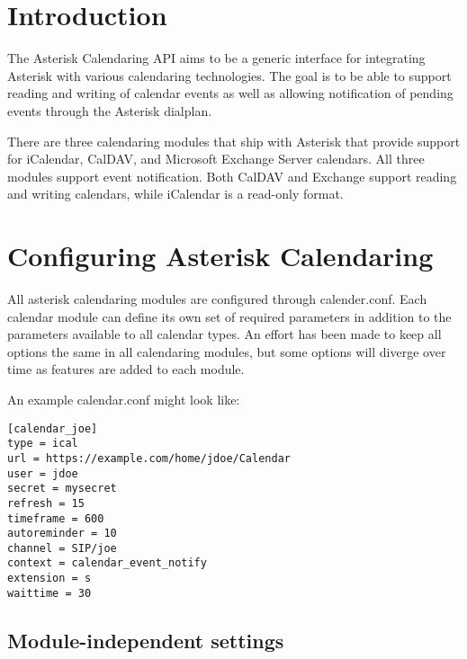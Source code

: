 \section{Introduction}

The Asterisk Calendaring API aims to be a generic interface for integrating
Asterisk with various calendaring technologies. The goal is to be able to
support reading and writing of calendar events as well as allowing notification
of pending events through the Asterisk dialplan.

There are three calendaring modules that ship with Asterisk that provide support
for iCalendar, CalDAV, and Microsoft Exchange Server calendars. All three
modules support event notification. Both CalDAV and Exchange support reading
and writing calendars, while iCalendar is a read-only format.

\section{Configuring Asterisk Calendaring}

All asterisk calendaring modules are configured through calender.conf. Each
calendar module can define its own set of required parameters in addition to the
parameters available to all calendar types. An effort has been made to keep all
options the same in all calendaring modules, but some options will diverge over
time as features are added to each module.

An example calendar.conf might look like:
\begin{astlisting}
\begin{verbatim}
[calendar_joe]
type = ical
url = https://example.com/home/jdoe/Calendar
user = jdoe
secret = mysecret
refresh = 15
timeframe = 600
autoreminder = 10
channel = SIP/joe
context = calendar_event_notify
extension = s
waittime = 30
\end{verbatim}
\end{astlisting}

\subsection{Module-independent settings}

